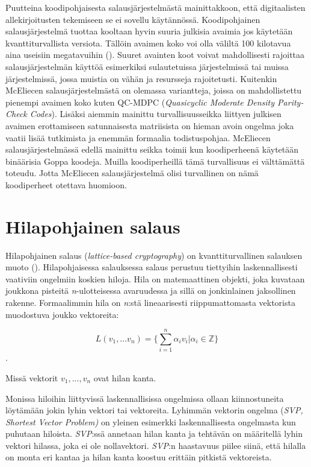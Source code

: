 Puutteina koodipohjaisesta salausjärjestelmästä mainittakkoon, että digitaalisten allekirjoitusten tekemiseen se ei sovellu käytännössä. Koodipohjainen salausjärjestelmä tuottaa kooltaan hyvin suuria julkisia avaimia jos käytetään kvanttiturvallista versiota. Tällöin avaimen koko voi olla väliltä 100 kilotavua aina useisiin megatavuihin (\cite{mavroeidis2018impact}). Suuret avainten koot voivat mahdollisesti rajoittaa salausjärjestelmän käyttöä esimerkiksi sulautetuissa järjestelmissä tai muissa järjestelmissä, jossa muistia on vähän ja resursseja rajoitetusti. Kuitenkin McEliecen salausjärjestelmästä on olemassa variantteja, joissa on mahdollistettu pienempi avaimen koko kuten QC-MDPC (\emph{Quasicyclic Moderate Density Parity-Check Codes}). Lisäksi aiemmin mainittu turvallisuusseikka liittyen julkisen avaimen erottamiseen satunnaisesta matriisista on hieman avoin ongelma joka vaatii lisää tutkimista ja enemmän formaalia todistuspohjaa. McEliecen salausjärjestelmässä edellä mainittu seikka toimii kun koodiperheenä käytetään binäärisia Goppa koodeja. Muilla koodiperheillä tämä turvallisuus ei välttämättä toteudu. Jotta McEliecen salausjärjestelmä olisi turvallinen on nämä koodiperheet otettava huomioon.


\section{Hilapohjainen salaus}
Hilapohjainen salaus (\emph{lattice-based cryptography}) on kvanttiturvallinen salauksen muoto (\cite{regev2006lattice}). Hilapohjaisessa salauksessa salaus perustuu tiettyihin laskennallisesti vaativiin ongelmiin koskien hiloja. Hila on matemaattinen objekti, joka kuvataan joukkona pisteitä \emph{n}-ulotteisessa avaruudessa ja sillä on jonkinlainen jaksollinen rakenne. Formaalimmin hila on \emph{n}:stä lineaarisesti riippumattomasta vektorista muodostuva joukko vektoreita: 

\[L(v_1,...v_n) =\Bigg\{ {\sum_{i=1}^{n}\alpha_i 
v_i|\alpha_i \in \mathbb{Z}} \Bigg\}\]. 

Missä vektorit $v_1,...,v_n$ ovat hilan kanta.

Monissa hiloihin liittyvissä 
laskennallisissa ongelmissa ollaan kiinnostuneita löytämään jokin lyhin vektori tai vektoreita. Lyhimmän vektorin ongelma (\emph{SVP, Shortest Vector Problem)} on yleinen esimerkki laskennallisesta ongelmasta kun puhutaan hiloista. \emph{SVP}:ssä annetaan hilan kanta ja tehtävän on määritellä lyhin vektori hilassa, joka ei ole nollavektori. \emph{SVP}:n haastavuus piilee siinä, että hilalla on monta eri kantaa ja hilan kanta koostuu erittäin pitkistä vektoreista.

